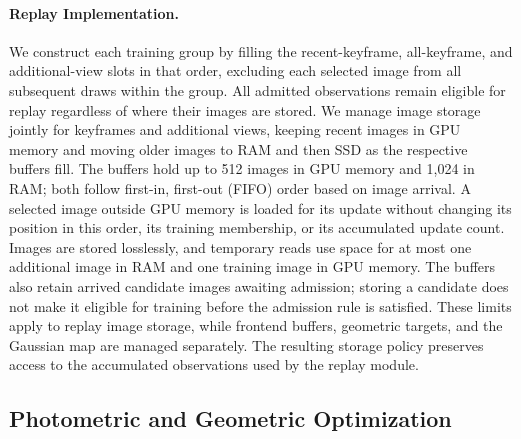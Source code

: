\paragraph{Replay Implementation.}
We construct each training group by filling the recent-keyframe, all-keyframe, and additional-view slots in that order, excluding each selected image from all subsequent draws within the group.
All admitted observations remain eligible for replay regardless of where their images are stored.
We manage image storage jointly for keyframes and additional views, keeping recent images in GPU memory and moving older images to RAM and then SSD as the respective buffers fill.
The buffers hold up to 512 images in GPU memory and 1,024 in RAM; both follow first-in, first-out (FIFO) order based on image arrival.
A selected image outside GPU memory is loaded for its update without changing its position in this order, its training membership, or its accumulated update count.
Images are stored losslessly, and temporary reads use space for at most one additional image in RAM and one training image in GPU memory.
The buffers also retain arrived candidate images awaiting admission; storing a candidate does not make it eligible for training before the admission rule is satisfied.
These limits apply to replay image storage, while frontend buffers, geometric targets, and the Gaussian map are managed separately.
The resulting storage policy preserves access to the accumulated observations used by the replay module.

\subsection{Photometric and Geometric Optimization}
\label{ssec:pip_optimization}
\label{ssec:carve}

